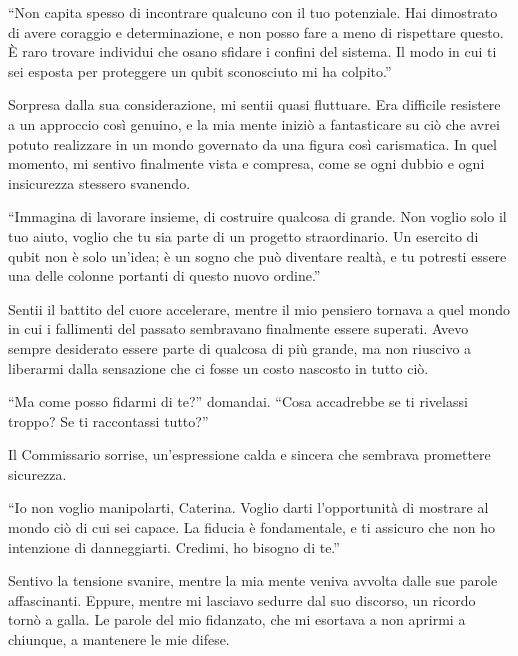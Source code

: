 \begin{dialogue}
 \enquote{Non capita spesso di incontrare qualcuno con il tuo potenziale. Hai dimostrato di avere coraggio e determinazione, e non posso fare a meno di rispettare questo. È raro trovare individui che osano sfidare i confini del sistema. Il modo in cui ti sei esposta per proteggere un qubit sconosciuto mi ha colpito.}
\end{dialogue}

Sorpresa dalla sua considerazione, mi sentii quasi fluttuare. Era difficile resistere a un approccio così genuino, e la mia mente iniziò a fantasticare su ciò che avrei potuto realizzare in un mondo governato da una figura così carismatica. In quel momento, mi sentivo finalmente vista e compresa, come se ogni dubbio e ogni insicurezza stessero svanendo.

\begin{dialogue}
 \enquote{Immagina di lavorare insieme, di costruire qualcosa di grande. Non voglio solo il tuo aiuto, voglio che tu sia parte di un progetto straordinario. Un esercito di qubit non è solo un'idea; è un sogno che può diventare realtà, e tu potresti essere una delle colonne portanti di questo nuovo ordine.}
\end{dialogue}

Sentii il battito del cuore accelerare, mentre il mio pensiero tornava a quel mondo in cui i fallimenti del passato sembravano finalmente essere superati. Avevo sempre desiderato essere parte di qualcosa di più grande, ma non riuscivo a liberarmi dalla sensazione che ci fosse un costo nascosto in tutto ciò.

\begin{dialogue}
 \enquote{Ma come posso fidarmi di te?} domandai. \enquote{Cosa accadrebbe se ti rivelassi troppo? Se ti raccontassi tutto?}
\end{dialogue}

Il Commissario sorrise, un'espressione calda e sincera che sembrava promettere sicurezza.

\begin{dialogue}
 \enquote{Io non voglio manipolarti, Caterina. Voglio darti l'opportunità di mostrare al mondo ciò di cui sei capace. La fiducia è fondamentale, e ti assicuro che non ho intenzione di danneggiarti. Credimi, ho bisogno di te.}
\end{dialogue}

Sentivo la tensione svanire, mentre la mia mente veniva avvolta dalle sue parole affascinanti. Eppure, mentre mi lasciavo sedurre dal suo discorso, un ricordo tornò a galla. Le parole del mio fidanzato, che mi esortava a non aprirmi a chiunque, a mantenere le mie difese.


